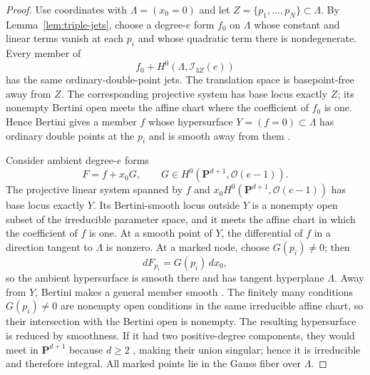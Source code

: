 \documentclass[11pt]{article}
\newcommand{\PP}{\mathbf P}
\newcommand{\cO}{\mathcal O}
\begin{document}
\begin{proof}
Use coordinates with $\Lambda=(x_0=0)$ and let
$Z=\{p_1,\ldots,p_N\}\subset\Lambda$.  By
Lemma~\ref{lem:triple-jets}, choose a degree-$e$ form $f_0$ on $\Lambda$
whose constant and linear terms vanish at each $p_i$ and whose quadratic term
there is nondegenerate.  Every member of
\[
 f_0+H^0(\Lambda,\mathcal I_{3Z}(e))
\]
has the same ordinary-double-point jets.  The translation space is
basepoint-free away from $Z$.  The corresponding projective system has base
locus exactly $Z$; its nonempty Bertini open meets the affine chart where the
coefficient of $f_0$ is one.  Hence Bertini gives a member $f$ whose hypersurface
$Y=(f=0)\subset\Lambda$ has ordinary double points at the $p_i$ and is smooth
away from them \cite[III, Corollary~10.9]{Hartshorne1977}.

Consider ambient degree-$e$ forms
\[
 F=f+x_0G,
 \qquad G\in H^0(\PP^{d+1},\cO(e-1)).
\]
The projective linear system spanned by $f$ and
$x_0H^0(\PP^{d+1},\cO(e-1))$ has base locus exactly $Y$.  Its Bertini-smooth
locus outside $Y$ is a nonempty open subset of the irreducible parameter
space, and it meets the affine chart in which the coefficient of $f$ is one.
At a smooth point of $Y$, the differential
of $f$ in a direction tangent to $\Lambda$ is nonzero.  At a marked node,
choose $G(p_i)\neq0$; then
\[
 dF_{p_i}=G(p_i)\,dx_0,
\]
so the ambient hypersurface is smooth there and has tangent hyperplane
$\Lambda$.  Away from $Y$, Bertini makes a general member smooth
\cite[III, Corollary~10.9]{Hartshorne1977}.  The finitely many conditions
$G(p_i)\neq0$ are nonempty open conditions in the same irreducible affine
chart, so their intersection with the Bertini open is nonempty.  The
resulting hypersurface is reduced by smoothness.  If it had two
positive-degree components, they would meet in $\PP^{d+1}$ because $d\geq2$
\cite[I, Theorem~7.2]{Hartshorne1977},
making their union singular; hence it is irreducible and therefore integral.
All marked points lie in the Gauss fiber over $\Lambda$.
\end{proof}
\end{document}

